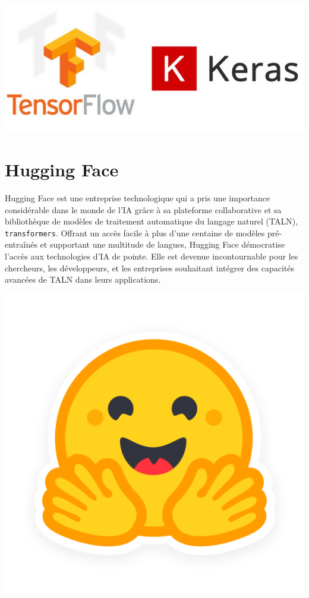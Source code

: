 \documentclass[
  letterpaper,
  DIV=11,
  numbers=noendperiod]{scrreprt}
\begin{document}
\includegraphics{images/tensorflowkeras.jpg}

\section{Hugging Face}\label{hugging-face}

Hugging Face est une entreprise technologique qui a pris une importance
considérable dans le monde de l'IA grâce à sa plateforme collaborative
et sa bibliothèque de modèles de traitement automatique du langage
naturel (TALN), \texttt{transformers}. Offrant un accès facile à plus
d'une centaine de modèles pré-entraînés et supportant une multitude de
langues, Hugging Face démocratise l'accès aux technologies d'IA de
pointe. Elle est devenue incontournable pour les chercheurs, les
développeurs, et les entreprises souhaitant intégrer des capacités
avancées de TALN dans leurs applications.

\includegraphics{images/hf-logo.png}
\end{document}

